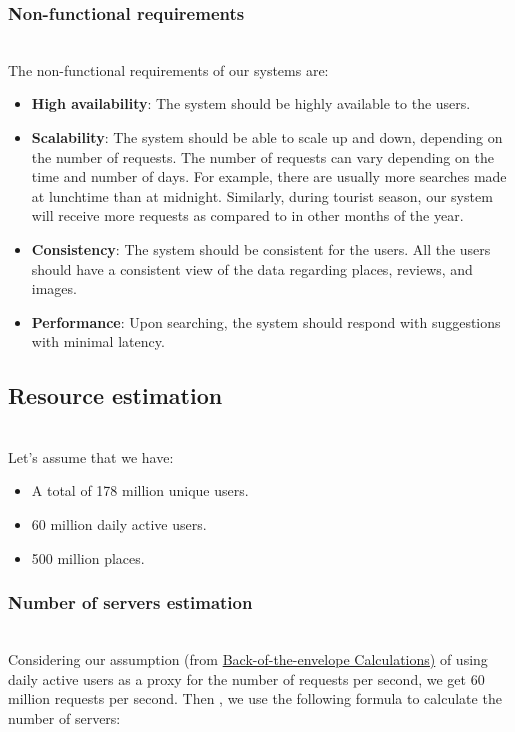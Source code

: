 \subsubsection{Non-functional requirements}\label{N4cUEmhAiBt7L8f7wRehH}
\\
The non-functional requirements of our systems are:

\begin{itemize}
\item
\protect{}\label{T9Z8_KZ8_BT_RIovQqdSg}
\textbf{High availability}: The system should be highly available to the users.
\item
\protect{}\label{y7q-xCZLjrT5jU84T-NRe}
\textbf{Scalability}: The system should be able to scale up and down, depending on the number of requests. The number of requests can vary depending on the time and number of days. For example, there are usually more searches made at lunchtime than at midnight. Similarly, during tourist season, our system will receive more requests as compared to in other months of the year.
\item
\protect{}\label{mcQskH_WyUfPhflcjvXAN}
\textbf{Consistency}: The system should be consistent for the users. All the users should have a consistent view of the data regarding places, reviews, and images.
\item
\protect{}\label{CPJFB3zTqCQwmh69T3DKp}
\textbf{Performance}: Upon searching, the system should respond with suggestions with minimal latency.
\end{itemize}

\subsection{Resource estimation}\label{-A-j9_kY5MW3kiTdL-gyu}
\\
Let's assume that we have:

\begin{itemize}
\item
\protect{}\label{Gzkq7BhJ4TVD_Iq5Ek0qg}
A total of 178 million unique users.
\item
\protect{}\label{dnXpTPiigxT9JLcU5PVHZ}
60 million daily active users.
\item
\protect{}\label{zljzis15nCzYmGz61nzjK}
500 million places.
\end{itemize}

\subsubsection{Number of servers estimation}\label{KukGgZb_2uqL2ZaVKPQvv}
\\
Considering our assumption (from \href{https://www.educative.io/courses/grokking-the-system-design-interview/put-back-of-the-envelope-numbers-in-perspective}{Back-of-the-envelope Calculations)} of using daily active users as a proxy for the number of requests per second, we get 60 million requests per second. Then , we use the following formula to calculate the number of servers:


